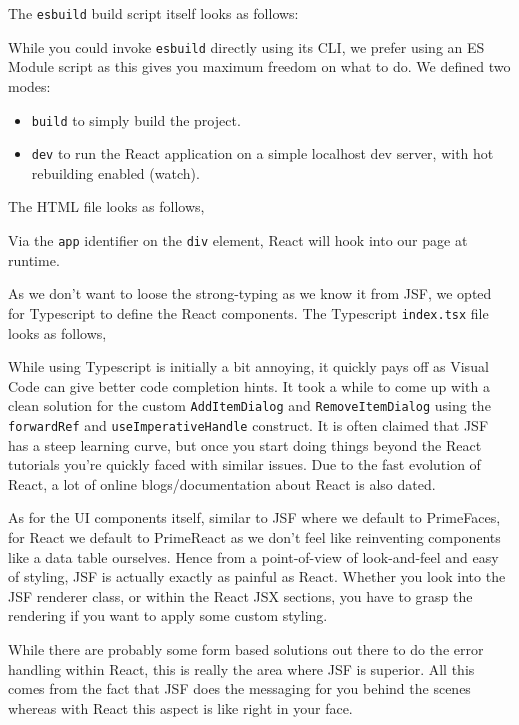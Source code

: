 The \texttt{esbuild} build script itself looks as follows:

While you could invoke \texttt{esbuild} directly using its CLI,
we prefer using an ES Module script as this gives you maximum freedom on what to do.
We defined two modes:
\begin{itemize}
	\item \texttt{build} to simply build the project.
	\item \texttt{dev} to run the React application on a simple localhost dev server, with hot rebuilding enabled (watch).
\end{itemize}

The HTML file looks as follows,

Via the \texttt{app} identifier on the \texttt{div} element, React will hook into our page at runtime.

As we don't want to loose the strong-typing as we know it from JSF, we opted for Typescript to define the React components.
The Typescript \texttt{index.tsx} file looks as follows,

While using Typescript is initially a bit annoying, it quickly pays off as Visual Code can give better code completion hints.
It took a while to come up with a clean solution for the custom \texttt{AddItemDialog} and \texttt{RemoveItemDialog} using the \texttt{forwardRef} and \texttt{useImperativeHandle} construct.
It is often claimed that JSF has a steep learning curve, but once you start doing things beyond the React tutorials you're quickly faced with similar issues.
Due to the fast evolution of React, a lot of online blogs/documentation about React is also dated.

As for the UI components itself, similar to JSF where we default to PrimeFaces, for React we default to PrimeReact as we don't feel like reinventing components like a data table ourselves.
Hence from a point-of-view of look-and-feel and easy of styling, JSF is actually exactly as painful as React.
Whether you look into the JSF renderer class, or within the React JSX sections, you have to grasp the rendering if you want to apply some custom styling.

While there are probably some form based solutions out there to do the error handling within React, this is really the area where JSF is superior.
All this comes from the fact that JSF does the messaging for you behind the scenes whereas with React this aspect is like right in your face.

